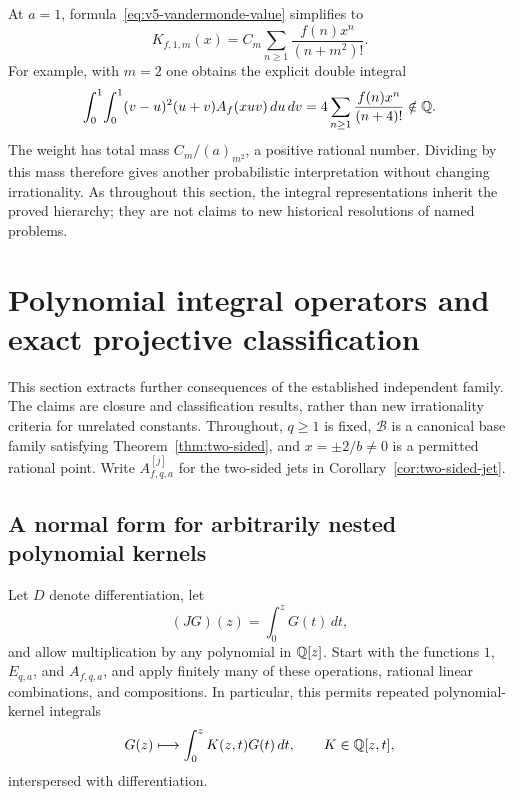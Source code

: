 At $a=1$, formula~\eqref{eq:v5-vandermonde-value} simplifies to
\[
 K_{f,1,m}(x)=C_m\sum_{n\geq1}\frac{f(n)x^n}{(n+m^2)!}.
\]
For example, with $m=2$ one obtains the explicit double integral
\[
 \int_0^1\!\int_0^1
  (v-u)^2(u+v)A_f(xuv)\,du\,dv
 =4\sum_{n\geq1}\frac{f(n)x^n}{(n+4)!}\notin\mathbb Q.
\]
The weight has total mass $C_m/(a)_{m^2}$, a positive rational number.
Dividing by this mass therefore gives another probabilistic
interpretation without changing irrationality.  As throughout this
section, the integral representations inherit the proved hierarchy;
they are not claims to new historical resolutions of named problems.

\section{Polynomial integral operators and exact projective classification}
\label{sec:operator-projective}

This section extracts further consequences of the established independent
family.  The claims are closure and classification results, rather than new
irrationality criteria for unrelated constants.  Throughout, $q\geq1$ is
fixed, $\mathcal B$ is a canonical base family satisfying
Theorem~\ref{thm:two-sided}, and $x=\pm2/b\ne0$ is a permitted rational
point.  Write $A_{f,q,a}^{[j]}$ for the two-sided jets in
Corollary~\ref{cor:two-sided-jet}.

\subsection{A normal form for arbitrarily nested polynomial kernels}

Let $D$ denote differentiation, let
\[
 (JG)(z)=\int_0^zG(t)\,dt,
\]
and allow multiplication by any polynomial in $\mathbb Q[z]$.  Start with the
functions $1$, $E_{q,a}$, and $A_{f,q,a}$, and apply finitely many of these
operations, rational linear combinations, and compositions.  In particular,
this permits repeated polynomial-kernel integrals
\[
 G(z)\longmapsto\int_0^z K(z,t)G(t)\,dt,
 \qquad K\in\mathbb Q[z,t],
\]
interspersed with differentiation.

